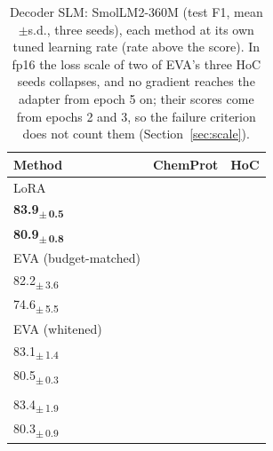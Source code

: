 \begin{table}[t]
\centering
\caption{Decoder SLM: SmolLM2-360M (test F1, mean$\pm$s.d., three seeds), each method at its own tuned learning rate (rate above the score). In fp16 the loss scale of two of EVA's three HoC seeds collapses, and no gradient reaches the adapter from epoch 5 on; their scores come from epochs 2 and 3, so the failure criterion does not count them (Section~\ref{sec:scale}).}
\label{tab:decoder}
\footnotesize
\setlength{\tabcolsep}{3pt}
\begin{tabular}{lcc}
\toprule
Method & ChemProt & HoC \\
\midrule
LoRA & \shortstack{$10^{-3}$\\\textbf{83.9\textsubscript{$\pm$\,0.5}}} & \shortstack{$10^{-3}$\\\textbf{80.9\textsubscript{$\pm$\,0.8}}} \\
EVA (budget-matched) & \shortstack{$3{\times}10^{-4}$\\82.2\textsubscript{$\pm$\,3.6}} & \shortstack{$10^{-3}$\\74.6\textsubscript{$\pm$\,5.5}} \\
EVA (whitened) & \shortstack{$10^{-3}$\\83.1\textsubscript{$\pm$\,1.4}} & \shortstack{$10^{-3}$\\80.5\textsubscript{$\pm$\,0.3}} \\
\method{} & \shortstack{$10^{-3}$\\83.4\textsubscript{$\pm$\,1.9}} & \shortstack{$10^{-3}$\\80.3\textsubscript{$\pm$\,0.9}} \\
\bottomrule
\end{tabular}
\end{table}
